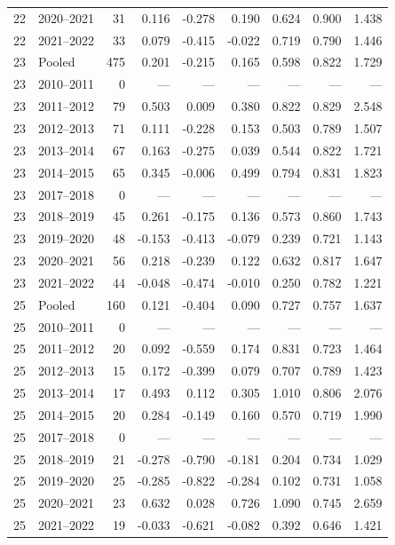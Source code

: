 \begin{longtable}{llrrrrrrr}
22 & 2020--2021 & 31 & 0.116 & -0.278 & 0.190 & 0.624 & 0.900 & 1.438 \\
22 & 2021--2022 & 33 & 0.079 & -0.415 & -0.022 & 0.719 & 0.790 & 1.446 \\
23 & Pooled & 475 & 0.201 & -0.215 & 0.165 & 0.598 & 0.822 & 1.729 \\
23 & 2010--2011 & 0 & --- & --- & --- & --- & --- & --- \\
23 & 2011--2012 & 79 & 0.503 & 0.009 & 0.380 & 0.822 & 0.829 & 2.548 \\
23 & 2012--2013 & 71 & 0.111 & -0.228 & 0.153 & 0.503 & 0.789 & 1.507 \\
23 & 2013--2014 & 67 & 0.163 & -0.275 & 0.039 & 0.544 & 0.822 & 1.721 \\
23 & 2014--2015 & 65 & 0.345 & -0.006 & 0.499 & 0.794 & 0.831 & 1.823 \\
23 & 2017--2018 & 0 & --- & --- & --- & --- & --- & --- \\
23 & 2018--2019 & 45 & 0.261 & -0.175 & 0.136 & 0.573 & 0.860 & 1.743 \\
23 & 2019--2020 & 48 & -0.153 & -0.413 & -0.079 & 0.239 & 0.721 & 1.143 \\
23 & 2020--2021 & 56 & 0.218 & -0.239 & 0.122 & 0.632 & 0.817 & 1.647 \\
23 & 2021--2022 & 44 & -0.048 & -0.474 & -0.010 & 0.250 & 0.782 & 1.221 \\
25 & Pooled & 160 & 0.121 & -0.404 & 0.090 & 0.727 & 0.757 & 1.637 \\
25 & 2010--2011 & 0 & --- & --- & --- & --- & --- & --- \\
25 & 2011--2012 & 20 & 0.092 & -0.559 & 0.174 & 0.831 & 0.723 & 1.464 \\
25 & 2012--2013 & 15 & 0.172 & -0.399 & 0.079 & 0.707 & 0.789 & 1.423 \\
25 & 2013--2014 & 17 & 0.493 & 0.112 & 0.305 & 1.010 & 0.806 & 2.076 \\
25 & 2014--2015 & 20 & 0.284 & -0.149 & 0.160 & 0.570 & 0.719 & 1.990 \\
25 & 2017--2018 & 0 & --- & --- & --- & --- & --- & --- \\
25 & 2018--2019 & 21 & -0.278 & -0.790 & -0.181 & 0.204 & 0.734 & 1.029 \\
25 & 2019--2020 & 25 & -0.285 & -0.822 & -0.284 & 0.102 & 0.731 & 1.058 \\
25 & 2020--2021 & 23 & 0.632 & 0.028 & 0.726 & 1.090 & 0.745 & 2.659 \\
25 & 2021--2022 & 19 & -0.033 & -0.621 & -0.082 & 0.392 & 0.646 & 1.421 \\

\end{longtable}
